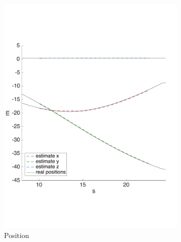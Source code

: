 \begin{figure}[!htbp]
  \centering
   \begin{subfigure}[b]{0.45\textwidth}
        \includegraphics[width=\textwidth]{img/tag_2ms_simulation_pos.pdf}
        \caption{Position }
        \label{fig:one_ekf_simulation_2ms}
   \end{subfigure}\hfill
   \begin{subfigure}[b]{0.45\textwidth}

\end{subfigure}
\end{figure}
